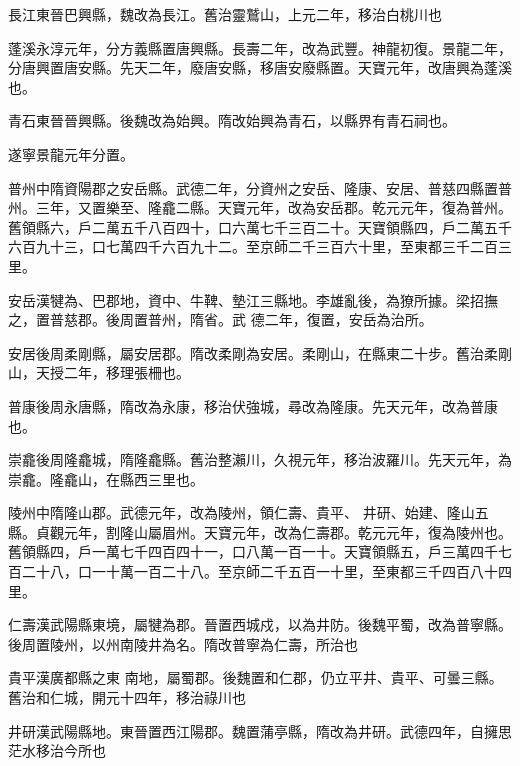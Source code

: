 \begin{pinyinscope}
 長江東晉巴興縣，魏改為長江。舊治靈鷲山，上元二年，移治白桃川也



 蓬溪永淳元年，分方義縣置唐興縣。長壽二年，改為武豐。神龍初復。景龍二年，分唐興置唐安縣。先天二年，廢唐安縣，移唐安廢縣置。天寶元年，改唐興為蓬溪也。



 青石東晉晉興縣。後魏改為始興。隋改始興為青石，以縣界有青石祠也。



 遂寧景龍元年分置。



 普州中隋資陽郡之安岳縣。武德二年，分資州之安岳、隆康、安居、普慈四縣置普州。三年，又置樂至、隆龕二縣。天寶元年，改為安岳郡。乾元元年，復為普州。舊領縣六，戶二萬五千八百四十，口六萬七千三百二十。天寶領縣四，戶二萬五千六百九十三，口七萬四千六百九十二。至京師二千三百六十里，至東都三千二百三里。



 安岳漢犍為、巴郡地，資中、牛鞞、墊江三縣地。李雄亂後，為獠所據。梁招撫之，置普慈郡。後周置普州，隋省。武
 德二年，復置，安岳為治所。



 安居後周柔剛縣，屬安居郡。隋改柔剛為安居。柔剛山，在縣東二十步。舊治柔剛山，天授二年，移理張柵也。



 普康後周永唐縣，隋改為永康，移治伏強城，尋改為隆康。先天元年，改為普康也。



 崇龕後周隆龕城，隋隆龕縣。舊治整瀨川，久視元年，移治波羅川。先天元年，為崇龕。隆龕山，在縣西三里也。



 陵州中隋隆山郡。武德元年，改為陵州，領仁壽、貴平、
 井研、始建、隆山五縣。貞觀元年，割隆山屬眉州。天寶元年，改為仁壽郡。乾元元年，復為陵州也。舊領縣四，戶一萬七千四百四十一，口八萬一百一十。天寶領縣五，戶三萬四千七百二十八，口一十萬一百二十八。至京師二千五百一十里，至東都三千四百八十四里。



 仁壽漢武陽縣東境，屬犍為郡。晉置西城戍，以為井防。後魏平蜀，改為普寧縣。後周置陵州，以州南陵井為名。隋改普寧為仁壽，所治也



 貴平漢廣都縣之東
 南地，屬蜀郡。後魏置和仁郡，仍立平井、貴平、可曇三縣。舊治和仁城，開元十四年，移治祿川也



 井研漢武陽縣地。東晉置西江陽郡。魏置蒲亭縣，隋改為井研。武德四年，自擁思茫水移治今所也




\end{pinyinscope}
